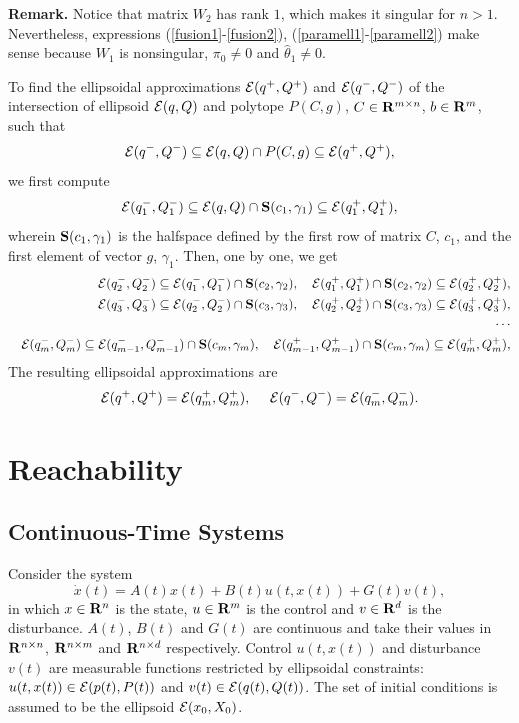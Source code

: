 \documentclass{report}
\newcommand{\EE}{{\cal E}}
\begin{document}
{\bf Remark.} Notice that matrix $W_2$ has rank $1$, which makes it singular
for $n>1$. Nevertheless, expressions (\ref{fusion1}-\ref{fusion2}),
(\ref{paramell1}-\ref{paramell2}) make sense because $W_1$ is nonsingular,
$\pi_0\neq0$ and $\hat{\theta}_1\neq0$.

To find the ellipsoidal approximations $\EE(q^+,Q^+)$ and $\EE(q^-,Q^-)$ of
the intersection of ellipsoid $\EE(q,Q)$ and polytope $P(C,g)$,
$C\in{\bf R}^{m\times n}$, $b\in{\bf R}^m$, such that
\[ \EE(q^-,Q^-)\subseteq\EE(q,Q)\cap P(C,g)\subseteq\EE(q^+,Q^+), \]
we first compute
\[ \EE(q^-_1,Q^-_1)\subseteq\EE(q,Q)\cap{\bf S}(c_1,\gamma_1)\subseteq
\EE(q^+_1,Q^+_1), \]
wherein ${\bf S}(c_1,\gamma_1)$ is the halfspace defined by the first row of matrix $C$,
$c_1$, and the first element of vector $g$, $\gamma_1$. Then, one by one, we get
\begin{eqnarray*}
& & \EE(q^-_2,Q^-_2)\subseteq\EE(q^-_1,Q^-_1)\cap{\bf S}(c_2,\gamma_2), ~~~
\EE(q^+_1,Q^+_1)\cap{\bf S}(c_2,\gamma_2)\subseteq\EE(q^+_2,Q^+_2), \\
& & \EE(q^-_3,Q^-_3)\subseteq\EE(q^-_2,Q^-_2)\cap{\bf S}(c_3,\gamma_3), ~~~
\EE(q^+_2,Q^+_2)\cap{\bf S}(c_3,\gamma_3)\subseteq\EE(q^+_3,Q^+_3), \\
& & \cdots \\
& & \EE(q^-_m,Q^-_m)\subseteq\EE(q^-_{m-1},Q^-_{m-1})\cap{\bf S}(c_m,\gamma_m), ~~~
\EE(q^+_{m-1},Q^+_{m-1})\cap{\bf S}(c_m,\gamma_m)\subseteq\EE(q^+_m,Q^+_m), \\
\end{eqnarray*}
The resulting ellipsoidal approximations are
\[ \EE(q^+,Q^+)=\EE(q^+_m,Q^+_m), ~~~~ \EE(q^-,Q^-)=\EE(q^-_m,Q^-_m) .\]





\chapter{Reachability}
\section{Continuous-Time Systems}
Consider the system
\begin{equation}
\dot{x}(t) = A(t)x(t) + B(t)u(t,x(t)) + G(t)v(t), \label{ctsystem}
\end{equation}
in which $x\in{\bf R}^n$ is the state, $u\in{\bf R}^m$ is the control and
$v\in{\bf R}^d$ is the disturbance. $A(t)$, $B(t)$ and $G(t)$
are continuous and take their values in ${\bf R}^{n\times n}$,
${\bf R}^{n\times m}$ and ${\bf R}^{n\times d}$ respectively.
Control $u(t,x(t))$ and disturbance $v(t)$ are measurable functions
restricted by ellipsoidal constraints:
$u(t,x(t)) \in \EE(p(t), P(t))$ and $v(t) \in \EE(q(t), Q(t))$.
The set of initial conditions is assumed to be the ellipsoid $\EE(x_0,X_0)$.
\end{document}
